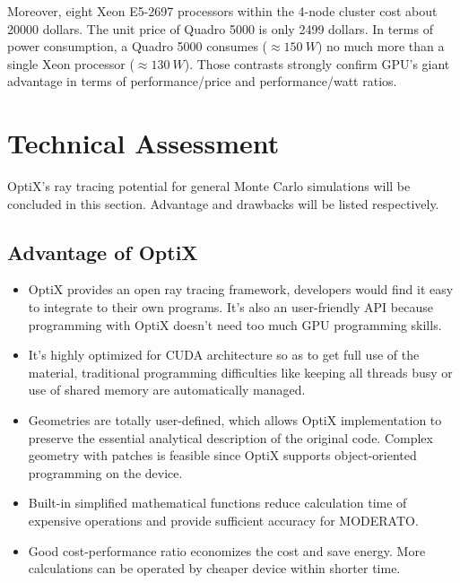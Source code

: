 Moreover, eight Xeon E5-2697 processors within the 4-node cluster cost about 20000 dollars. The unit price of Quadro 5000 is only 2499 dollars. In terms of power consumption, a Quadro 5000 consumes ($\approx 150 \ W$) no much more than a single Xeon processor ($\approx 130 \ W$). Those contrasts strongly confirm GPU's giant advantage in terms of performance/price and performance/watt ratios.

\section{Technical Assessment}
OptiX's ray tracing potential for general Monte Carlo simulations will be concluded in this section. Advantage and drawbacks will be listed respectively. 

\subsection{Advantage of OptiX}
\begin{itemize}
  \item OptiX provides an open ray tracing framework, developers would find it easy to integrate to their own programs. It's also an user-friendly API because programming with OptiX doesn't need too much GPU programming skills. 
  \item It's highly optimized for CUDA architecture so as to get full use of the material, traditional programming difficulties like keeping all threads busy or use of shared memory are automatically managed.
	\item Geometries are totally user-defined, which allows OptiX implementation to preserve the essential analytical description of the original code. Complex geometry with patches is feasible since OptiX supports object-oriented programming on the device.
	\item Built-in simplified mathematical functions reduce calculation time of expensive operations and provide sufficient accuracy for MODERATO. 
  \item Good cost-performance ratio economizes the cost and save energy. More calculations can be operated by cheaper device within shorter time.
\end{itemize}


